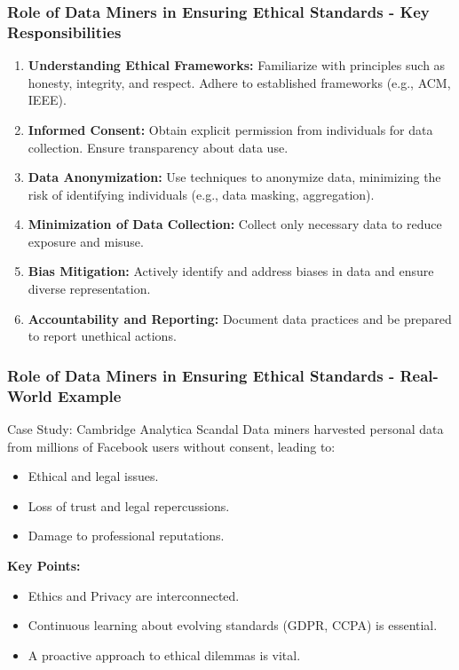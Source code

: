 \documentclass[aspectratio=169]{beamer}
\begin{document}
\begin{frame}[fragile]
    \frametitle{Role of Data Miners in Ensuring Ethical Standards - Key Responsibilities}
    \begin{enumerate}
        \item \textbf{Understanding Ethical Frameworks:} Familiarize with principles such as honesty, integrity, and respect. Adhere to established frameworks (e.g., ACM, IEEE).
        
        \item \textbf{Informed Consent:} Obtain explicit permission from individuals for data collection. Ensure transparency about data use.
        
        \item \textbf{Data Anonymization:} Use techniques to anonymize data, minimizing the risk of identifying individuals (e.g., data masking, aggregation).
        
        \item \textbf{Minimization of Data Collection:} Collect only necessary data to reduce exposure and misuse.
        
        \item \textbf{Bias Mitigation:} Actively identify and address biases in data and ensure diverse representation.
        
        \item \textbf{Accountability and Reporting:} Document data practices and be prepared to report unethical actions.
    \end{enumerate}
\end{frame}

\begin{frame}[fragile]
    \frametitle{Role of Data Miners in Ensuring Ethical Standards - Real-World Example}
    \begin{block}{Case Study: Cambridge Analytica Scandal}
        Data miners harvested personal data from millions of Facebook users without consent, leading to:
        \begin{itemize}
            \item Ethical and legal issues.
            \item Loss of trust and legal repercussions.
            \item Damage to professional reputations.
        \end{itemize}
    \end{block}
    
    \textbf{Key Points:}
    \begin{itemize}
        \item Ethics and Privacy are interconnected.
        \item Continuous learning about evolving standards (GDPR, CCPA) is essential.
        \item A proactive approach to ethical dilemmas is vital.
    \end{itemize}
\end{frame}
\end{document}
